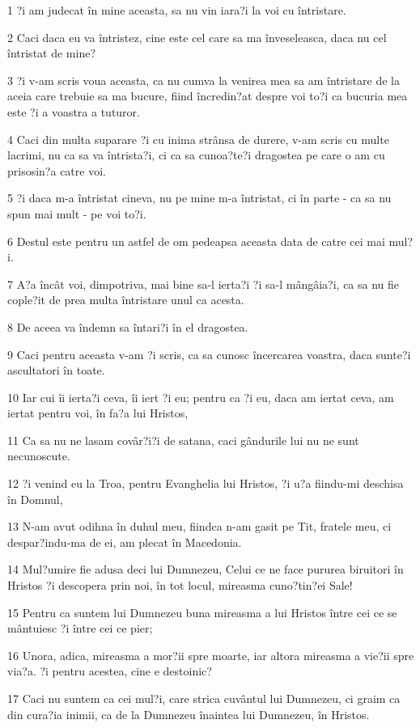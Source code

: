 \par 1 ?i am judecat în mine aceasta, sa nu vin iara?i la voi cu întristare.
\par 2 Caci daca eu va întristez, cine este cel care sa ma înveseleasca, daca nu cel întristat de mine?
\par 3 ?i v-am scris voua aceasta, ca nu cumva la venirea mea sa am întristare de la aceia care trebuie sa ma bucure, fiind încredin?at despre voi to?i ca bucuria mea este ?i a voastra a tuturor.
\par 4 Caci din multa suparare ?i cu inima strânsa de durere, v-am scris cu multe lacrimi, nu ca sa va întrista?i, ci ca sa cunoa?te?i dragostea pe care o am cu prisosin?a catre voi.
\par 5 ?i daca m-a întristat cineva, nu pe mine m-a întristat, ci în parte - ca sa nu spun mai mult - pe voi to?i.
\par 6 Destul este pentru un astfel de om pedeapsa aceasta data de catre cei mai mul?i.
\par 7 A?a încât voi, dimpotriva, mai bine sa-l ierta?i ?i sa-l mângâia?i, ca sa nu fie cople?it de prea multa întristare unul ca acesta.
\par 8 De aceea va îndemn sa întari?i în el dragostea.
\par 9 Caci pentru aceasta v-am ?i scris, ca sa cunosc încercarea voastra, daca sunte?i ascultatori în toate.
\par 10 Iar cui îi ierta?i ceva, îi iert ?i eu; pentru ca ?i eu, daca am iertat ceva, am iertat pentru voi, în fa?a lui Hristos,
\par 11 Ca sa nu ne lasam covâr?i?i de satana, caci gândurile lui nu ne sunt necunoscute.
\par 12 ?i venind eu la Troa, pentru Evanghelia lui Hristos, ?i u?a fiindu-mi deschisa în Domnul,
\par 13 N-am avut odihna în duhul meu, fiindca n-am gasit pe Tit, fratele meu, ci despar?indu-ma de ei, am plecat în Macedonia.
\par 14 Mul?umire fie adusa deci lui Dumnezeu, Celui ce ne face pururea biruitori în Hristos ?i descopera prin noi, în tot locul, mireasma cuno?tin?ei Sale!
\par 15 Pentru ca suntem lui Dumnezeu buna mireasma a lui Hristos între cei ce se mântuiesc ?i între cei ce pier;
\par 16 Unora, adica, mireasma a mor?ii spre moarte, iar altora mireasma a vie?ii spre via?a. ?i pentru acestea, cine e destoinic?
\par 17 Caci nu suntem ca cei mul?i, care strica cuvântul lui Dumnezeu, ci graim ca din cura?ia inimii, ca de la Dumnezeu înaintea lui Dumnezeu, în Hristos.

